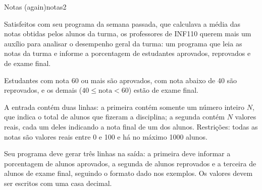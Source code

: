 \documentclass[12pt,a4paper,oneside]{article}
\begin{document}
\begin{problem}{Notas (again)}{notas}{2}

Satisfeitos com seu programa da semana passada, que calculava a média das notas obtidas pelos alunos da turma, os professores de INF110 querem mais um auxílio para analisar o desempenho geral da turma: um programa que leia as notas da turma e informe a porcentagem de estudantes aprovados, reprovados e de exame final.

Estudantes com nota 60 ou mais são aprovados, com nota abaixo de 40 são reprovados, e os demais ($40 \leq \text{nota} < 60$) estão de exame final.

%

\InputFile

A entrada contém duas linhas: a primeira contém somente um número inteiro $N$, que indica o total de alunos que fizeram a disciplina; a segunda contém $N$ valores reais, cada um deles indicando a nota final de um dos alunos. Restrições: todas as notas são valores reais entre 0 e 100 e há no máximo 1000 alunos.


\OutputFile

Seu programa deve gerar três linhas na saída: a primeira deve informar a porcentagem de alunos aprovados, a segunda de alunos reprovados e a terceira de alunos de exame final, seguindo o formato dado nos exemplos. Os valores devem ser escritos com uma casa decimal.

\Example

\begin{example}
%
\end{example}

\begin{example}
%
\end{example}


\begin{example}
%
\end{example}


\end{problem}
\end{document}
